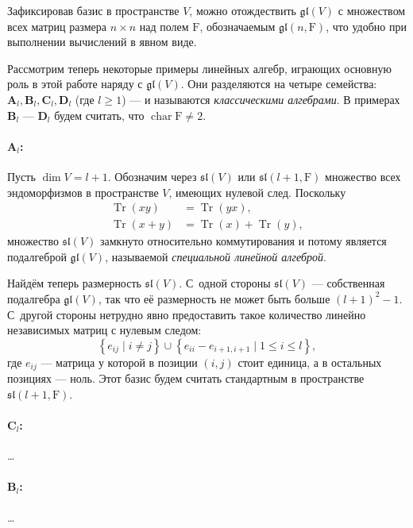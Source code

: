 \documentclass[a4paper, 12pt]{article}
\theoremstyle{definition}
\begin{document}
Зафиксировав базис в пространстве \( V \), можно отождествить \( \mathfrak{gl}(V) \) с множеством всех матриц размера \( n \times n \) над полем \( \mathrm F \), обозначаемым \( \mathfrak{gl}(n, \mathrm F) \), что удобно при выполнении вычислений в явном виде.

Рассмотрим теперь некоторые примеры линейных алгебр, играющих основную роль в этой работе наряду с \( \mathfrak{gl}(V) \). Они разделяются на четыре семейства: \( \mathbf{A}_l, \mathbf{B}_l, \mathbf{C}_l, \mathbf{D}_l \) (где \( l \geqslant 1 \)) --- и называются \textit{классическими алгебрами}. В примерах \( \mathbf{B}_l \) ---  \( \mathbf{D}_l \) будем считать, что \( \operatorname{char} \mathrm F \neq 2 \).

\paragraph{\( \mathbf{A}_l \):}
Пусть \( \dim V = l + 1 \). Обозначим через \( \mathfrak{sl}(V) \) или \( \mathfrak{sl}(l + 1, \mathrm F) \) множество всех эндоморфизмов в пространстве \( V \), имеющих нулевой след. Поскольку
\begin{align*}
    \operatorname{Tr}(xy) &= \operatorname{Tr}(yx), \\
    \operatorname{Tr}(x + y) &= \operatorname{Tr}(x) + \operatorname{Tr}(y),
\end{align*}
множество \( \mathfrak{sl}(V) \) замкнуто относительно коммутирования и потому является подалгеброй \( \mathfrak{gl}(V) \), называемой \textit{специальной линейной алгеброй}.

Найдём теперь размерность \( \mathfrak{sl}(V) \). С~одной стороны \( \mathfrak{sl}(V) \) --- собственная подалгебра \( \mathfrak{gl}(V) \), так что её размерность не может быть больше \({ (l + 1)^2 - 1 }\). С~другой стороны нетрудно явно предоставить такое количество линейно независимых матриц с нулевым следом:
\[
    \left\{ e_{ij} \mid i \neq j \right\} \cup \left\{ e_{ii} - e_{i + 1, i + 1} \mid 1 \leqslant i \leqslant l \right\},
\]
где \( e_{ij} \) --- матрица у которой в позиции \({ (i, j) }\) стоит единица, а в остальных позициях --- ноль. Этот базис будем считать стандартным в пространстве \({ \mathfrak{sl}(l + 1, \mathrm F) }\).

\paragraph{\( \mathbf{C}_l \):} \ldots
\paragraph{\( \mathbf{B}_l \):} \ldots
\end{document}
